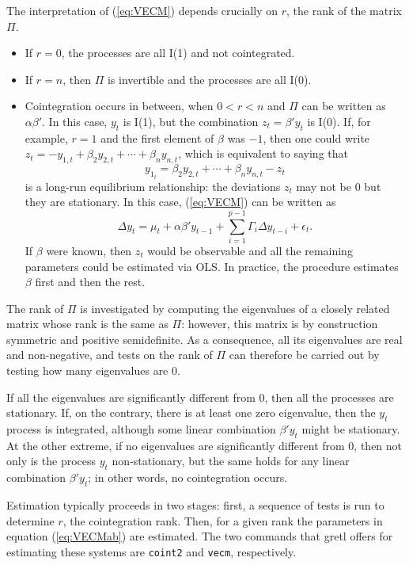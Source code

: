 The interpretation of (\ref{eq:VECM}) depends crucially on $r$, the rank of
the matrix $\Pi$.
\begin{itemize}
\item If $r = 0$, the processes are all I(1) and not cointegrated.
\item If $r = n$, then $\Pi$ is invertible and the processes are all I(0).
\item Cointegration occurs in between, when $0 < r < n$ and $\Pi$ can
  be written as $\alpha \beta'$. In this case, $y_t$ is I(1), but the
  combination $z_t = \beta'y_t$ is I(0). If, for example, $r=1$ and
  the first element of $\beta$ was $-1$, then one could write $z_t =
  -y_{1,t} + \beta_2 y_{2,t} + \cdots + \beta_n y_{n,t}$, which is
  equivalent to saying that
  \[
    y_{1_t} = \beta_2 y_{2,t} + \cdots + \beta_n y_{n,t} - z_t
  \]
  is a long-run equilibrium relationship: the deviations $z_t$
  may not be 0 but they are stationary. In this case, (\ref{eq:VECM})
  can be written as 
  \begin{equation}
    \label{eq:VECMab}
    \Delta y_t = \mu_t + \alpha \beta' y_{t-1} + \sum_{i=1}^{p-1} \Gamma_i 
    \Delta y_{t-i} + \epsilon_t .
  \end{equation}
  If $\beta$ were known, then $z_t$ would be observable and all the
  remaining parameters could be estimated via OLS.  In practice, the
  procedure estimates $\beta$ first and then the rest.
\end{itemize}

The rank of $\Pi$ is investigated by computing the eigenvalues of a
closely related matrix whose rank is the same as $\Pi$: however, this
matrix is by construction symmetric and positive semidefinite.  As a
consequence, all its eigenvalues are real and non-negative, and tests
on the rank of $\Pi$ can therefore be carried out by testing how many
eigenvalues are 0.

If all the eigenvalues are significantly different from 0, then all
the processes are stationary. If, on the contrary, there is at least
one zero eigenvalue, then the $y_t$ process is integrated, although
some linear combination $\beta'y_t$ might be stationary. At the other
extreme, if no eigenvalues are significantly different from 0, then
not only is the process $y_t$ non-stationary, but the same holds for
any linear combination $\beta'y_t$; in other words, no cointegration
occurs.

Estimation typically proceeds in two stages: first, a sequence of
tests is run to determine $r$, the cointegration rank. Then, for a
given rank the parameters in equation (\ref{eq:VECMab}) are estimated.
The two commands that gretl offers for estimating these systems
are \texttt{coint2} and \texttt{vecm}, respectively. 

